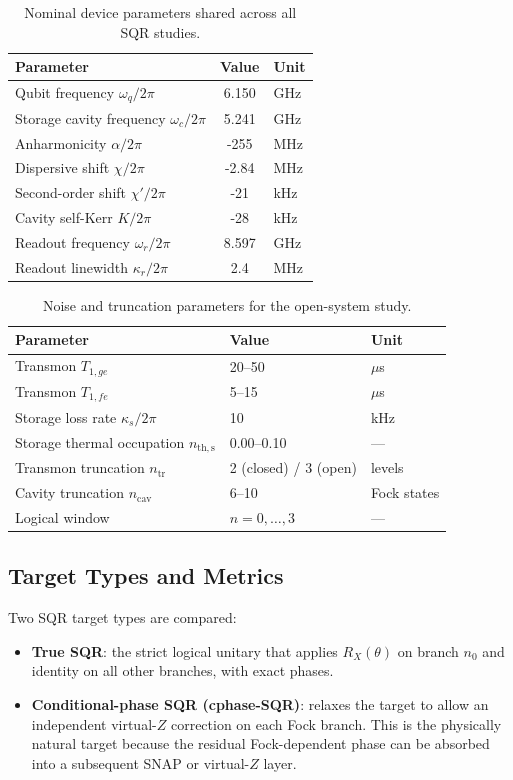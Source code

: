 \documentclass[aps,pra,twocolumn,reprint,amsmath,amssymb]{revtex4-2}
\begin{document}
\begin{table}[tp]
\centering
\caption{Nominal device parameters shared across all SQR studies.}
\begin{tabular}{@{} l S[table-format=+3.3] l @{}}
\toprule
Parameter & {Value} & Unit \\
\midrule
Qubit frequency $\omega_q/2\pi$ & 6.150 & GHz \\
Storage cavity frequency $\omega_c/2\pi$ & 5.241 & GHz \\
Anharmonicity $\alpha/2\pi$ & -255 & MHz \\
Dispersive shift $\chi/2\pi$ & -2.84 & MHz \\
Second-order shift $\chi'/2\pi$ & -21 & kHz \\
Cavity self-Kerr $K/2\pi$ & -28 & kHz \\
Readout frequency $\omega_r/2\pi$ & 8.597 & GHz \\
Readout linewidth $\kappa_r/2\pi$ & 2.4 & MHz \\
\bottomrule
\end{tabular}
\label{tab:device_params}
\end{table}

\begin{table}[tp]
\centering
\caption{Noise and truncation parameters for the open-system study.}
\begin{tabular}{@{} l l l @{}}
\toprule
Parameter & Value & Unit \\
\midrule
Transmon $T_{1,ge}$ & 20--50 & $\mu$s \\
Transmon $T_{1,fe}$ & 5--15 & $\mu$s \\
Storage loss rate $\kappa_s/2\pi$ & 10 & kHz \\
Storage thermal occupation $n_\mathrm{th,s}$ & 0.00--0.10 & --- \\
Transmon truncation $n_\mathrm{tr}$ & 2 (closed) / 3 (open) & levels \\
Cavity truncation $n_\mathrm{cav}$ & 6--10 & Fock states \\
Logical window & $n = 0, \ldots, 3$ & --- \\
\bottomrule
\end{tabular}
\label{tab:noise_params}
\end{table}

\subsection{Target Types and Metrics}

Two SQR target types are compared:
\begin{itemize}
\item \textbf{True SQR}: the strict logical unitary that applies $R_X(\theta)$ on branch $n_0$ and identity on all other branches, with exact phases.
\item \textbf{Conditional-phase SQR (cphase-SQR)}: relaxes the target to allow an independent virtual-$Z$ correction on each Fock branch. This is the physically natural target because the residual Fock-dependent phase can be absorbed into a subsequent SNAP or virtual-$Z$ layer.
\end{itemize}
\end{document}
